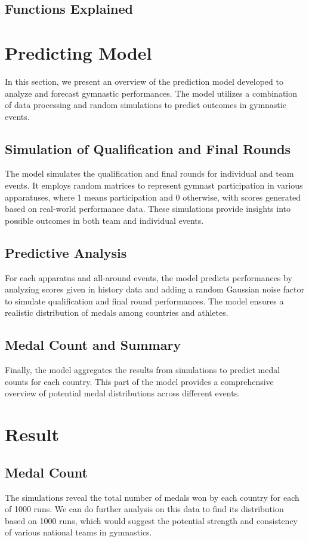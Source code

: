 \documentclass{article}
\theoremstyle{roman}
\begin{document}
\subsection{Functions Explained}
\section{Predicting Model}
In this section, we present an overview of the prediction model developed to analyze and forecast gymnastic performances. The model utilizes a combination of data processing and random simulations to predict outcomes in gymnastic events.

\subsection{Simulation of Qualification and Final Rounds}
The model simulates the qualification and final rounds for individual and team events. It employs random matrices to represent gymnast participation in various apparatuses, where 1 means participation and 0 otherwise, with scores generated based on real-world performance data. These simulations provide insights into possible outcomes in both team and individual events.

\subsection{Predictive Analysis}
For each apparatus and all-around events, the model predicts performances by analyzing scores given in history data and adding a random Gaussian noise factor to simulate qualification and final round performances. The model ensures a realistic distribution of medals among countries and athletes.

\subsection{Medal Count and Summary}
Finally, the model aggregates the results from simulations to predict medal counts for each country. This part of the model provides a comprehensive overview of potential medal distributions across different events.

\section{Result}
\subsection{Medal Count} The simulations reveal the total number of medals won by each country for each of 1000 runs. We can do further analysis on this data to find its distribution based on 1000 runs, which would suggest the potential strength and consistency of various national teams in gymnastics.
\end{document}
